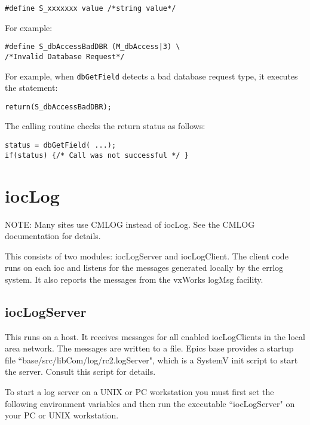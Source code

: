 \begin{verbatim}
#define S_xxxxxxx value /*string value*/
\end{verbatim}

For example:

\begin{verbatim}
#define S_dbAccessBadDBR (M_dbAccess|3) \
/*Invalid Database Request*/
\end{verbatim}

For example, when \verb|dbGetField| detects a bad database request type, it executes the statement:

\begin{verbatim}
return(S_dbAccessBadDBR);
\end{verbatim}

The calling routine checks the return status as follows:

\begin{verbatim}
status = dbGetField( ...);
if(status) {/* Call was not successful */ }
\end{verbatim}

\section{iocLog}

NOTE: Many sites use CMLOG instead of iocLog. See the CMLOG documentation for details.

This consists of two modules: iocLogServer and iocLogClient. The client code runs on each ioc and listens for the 
messages generated locally by the errlog system. It also reports the messages from the vxWorks logMsg facility.

\subsection{iocLogServer}

This runs on a host. It receives messages for all enabled iocLogClients in the local area network. The messages are written 
to a file. Epics base provides a startup file ``base/src/libCom/log/rc2.logServer", which is a SystemV init script to start the server. 
Consult this script for details.

To start a log server on a UNIX or PC workstation you must first set the following environment variables and then run the 
executable ``iocLogServer" on your PC or UNIX workstation. 


